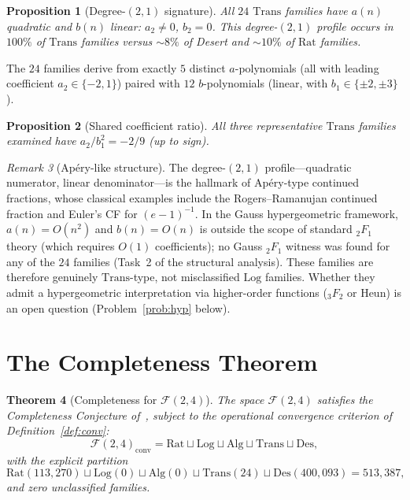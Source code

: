 \documentclass{amsart}
\newtheorem{theorem}{Theorem}[section]
\newtheorem{proposition}[theorem]{Proposition}
\theoremstyle{definition}
\theoremstyle{remark}
\newtheorem{remark}[theorem]{Remark}
\newcommand{\FF}{\mathcal{F}}
\newcommand{\Rat}{\mathrm{Rat}}
\newcommand{\Log}{\mathrm{Log}}
\newcommand{\Alg}{\mathrm{Alg}}
\newcommand{\Trans}{\mathrm{Trans}}
\newcommand{\Des}{\mathrm{Des}}
\begin{document}
\begin{proposition}[Degree-$(2,1)$ signature]\label{prop:deg21}
All $24$ $\Trans$ families have $a(n)$ quadratic and $b(n)$ linear:
$a_2 \ne 0$, $b_2 = 0$.  This degree-$(2,1)$ profile occurs in $100\%$
of $\Trans$ families versus ${\sim}8\%$ of Desert and ${\sim}10\%$ of
$\Rat$ families.
\end{proposition}

The $24$ families derive from exactly $5$ distinct $a$-polynomials (all
with leading coefficient $a_2 \in \{-2, 1\}$) paired with $12$
$b$-polynomials (linear, with $b_1 \in \{\pm 2, \pm 3\}$).

\begin{proposition}[Shared coefficient ratio]\label{prop:ratio}
All three representative $\Trans$ families examined have $a_2/b_1^2 =
-2/9$ (up to sign).
\end{proposition}

\begin{remark}[Ap\'ery-like structure]\label{rem:apery}
The degree-$(2,1)$ profile---quadratic numerator, linear denominator---is
the hallmark of Ap\'ery-type continued fractions, whose classical examples
include the Rogers--Ramanujan continued fraction and Euler's CF for
$(e-1)^{-1}$.  In the Gauss hypergeometric framework, $a(n) = O(n^2)$ and
$b(n) = O(n)$ is outside the scope of standard ${}_2F_1$ theory (which
requires $O(1)$ coefficients); no Gauss ${}_2F_1$ witness was found for
any of the $24$ families (Task~2 of the structural analysis).  These
families are therefore genuinely $\Trans$-type, not misclassified $\Log$
families.  Whether they admit a hypergeometric interpretation via
higher-order functions (${}_3F_2$ or Heun) is an open question
(Problem~\ref{prob:hyp} below).
\end{remark}

\section{The Completeness Theorem}\label{sec:completeness}

\begin{theorem}[Completeness for $\FF(2,4)$]\label{thm:complete}
The space $\FF(2,4)$ satisfies the Completeness Conjecture
of~\cite{synthesis}, subject to the operational convergence
criterion of Definition~\ref{def:conv}:
\[
  \FF(2,4)_{\mathrm{conv}} = \Rat \sqcup \Log \sqcup \Alg \sqcup \Trans
  \sqcup \Des,
\]
with the explicit partition
\[
  \Rat(113{,}270) \sqcup \Log(0) \sqcup \Alg(0) \sqcup \Trans(24) \sqcup
  \Des(400{,}093) = 513{,}387,
\]
and zero unclassified families.
\end{theorem}
\end{document}
